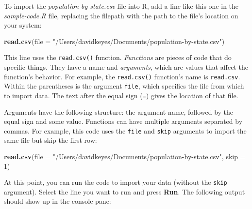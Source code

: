 \documentclass[
]{book}
\newenvironment{Shaded}{\begin{snugshade}}{\end{snugshade}}
\newcommand{\AttributeTok}[1]{\textcolor[rgb]{0.13,0.29,0.53}{#1}}
\newcommand{\DecValTok}[1]{\textcolor[rgb]{0.00,0.00,0.81}{#1}}
\newcommand{\FunctionTok}[1]{\textcolor[rgb]{0.13,0.29,0.53}{\textbf{#1}}}
\newcommand{\NormalTok}[1]{#1}
\newcommand{\StringTok}[1]{\textcolor[rgb]{0.31,0.60,0.02}{#1}}
\begin{document}
To import the \emph{population-by-state.csv} file into R, add a line like this one in the \emph{sample-code.R} file, replacing the filepath with the path to the file's location on your system:

\begin{Shaded}
\begin{Highlighting}[]
\FunctionTok{read.csv}\NormalTok{(}\AttributeTok{file =} \StringTok{"/Users/davidkeyes/Documents/population{-}by{-}state.csv"}\NormalTok{)}
\end{Highlighting}
\end{Shaded}

This line uses the \texttt{read.csv()} function. \emph{Functions} are pieces of code that do specific things. They have a name and \emph{arguments}, which are values that affect the function's behavior. For example, the \texttt{read.csv()} function's name is \texttt{read.csv}. Within the parentheses is the argument \texttt{file}, which specifies the file from which to import data. The text after the equal sign (\texttt{=}) gives the location of that file.

Arguments have the following structure: the argument name, followed by the equal sign and some value. Functions can have multiple arguments separated by commas. For example, this code uses the \texttt{file} and \texttt{skip} arguments to import the same file but skip the first row:

\begin{Shaded}
\begin{Highlighting}[]
\FunctionTok{read.csv}\NormalTok{(}\AttributeTok{file =} \StringTok{"/Users/davidkeyes/Documents/population{-}by{-}state.csv"}\NormalTok{,}
                 \AttributeTok{skip =} \DecValTok{1}\NormalTok{)}
\end{Highlighting}
\end{Shaded}

At this point, you can run the code to import your data (without the \texttt{skip} argument). Select the line you want to run and press \textbf{Run}. The following output should show up in the console pane:
\end{document}
